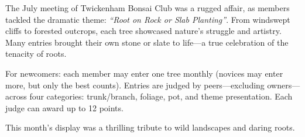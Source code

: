 \label{2025-07-contest}
\noindent
The July meeting of Twickenham Bonsai Club was a rugged affair, as members tackled the dramatic theme: \textit{``Root on Rock or Slab Planting''}.
From windswept cliffs to forested outcrops, each tree showcased nature's struggle and artistry.
Many entries brought their own stone or slate to life---a true celebration of the tenacity of roots.

For newcomers: each member may enter one tree monthly (novices may enter more, but only the best counts).
Entries are judged by peers---excluding owners---across four categories: trunk/branch, foliage, pot, and theme presentation.
Each judge can award up to 12 points.

\noindent 
This month's display was a thrilling tribute to wild landscapes and daring roots.

